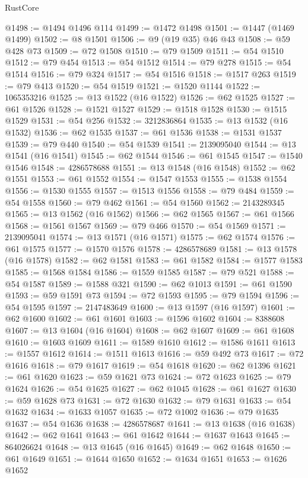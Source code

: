 \begin{lexlean}{RustCore}
\begin{coremodule}
@1498 := @1494 @1496 @114
@1499 := @1472 @1498
@1501 := @1447 (@1469 @1499)
@1502 := @8 @1501
@1506 := @9 (@19 @35) @46 @43
@1508 := @59 @428 @73
@1509 := @72 @1508
@1510 := @79 @1509
@1511 := @54 @1510
@1512 := @79 @454
@1513 := @54 @1512
@1514 := @79 @278
@1515 := @54 @1514
@1516 := @79 @324
@1517 := @54 @1516
@1518 := @1517 @263
@1519 := @79 @413
@1520 := @54 @1519
@1521 := @1520 @1144
@1522 := 1065353216
@1525 := @13 @1522 (@16 @1522)
@1526 := @62 @1525
@1527 := @61 @1526
@1528 := @1521 @1527
@1529 := @1518 @1528
@1530 := @1515 @1529
@1531 := @54 @256
@1532 := 3212836864
@1535 := @13 @1532 (@16 @1532)
@1536 := @62 @1535
@1537 := @61 @1536
@1538 := @1531 @1537
@1539 := @79 @440
@1540 := @54 @1539
@1541 := 2139095040
@1544 := @13 @1541 (@16 @1541)
@1545 := @62 @1544
@1546 := @61 @1545
@1547 := @1540 @1546
@1548 := 4286578688
@1551 := @13 @1548 (@16 @1548)
@1552 := @62 @1551
@1553 := @61 @1552
@1554 := @1547 @1553
@1555 := @1538 @1554
@1556 := @1530 @1555
@1557 := @1513 @1556
@1558 := @79 @484
@1559 := @54 @1558
@1560 := @79 @462
@1561 := @54 @1560
@1562 := 2143289345
@1565 := @13 @1562 (@16 @1562)
@1566 := @62 @1565
@1567 := @61 @1566
@1568 := @1561 @1567
@1569 := @79 @466
@1570 := @54 @1569
@1571 := 2139095041
@1574 := @13 @1571 (@16 @1571)
@1575 := @62 @1574
@1576 := @61 @1575
@1577 := @1570 @1576
@1578 := 4286578689
@1581 := @13 @1578 (@16 @1578)
@1582 := @62 @1581
@1583 := @61 @1582
@1584 := @1577 @1583
@1585 := @1568 @1584
@1586 := @1559 @1585
@1587 := @79 @521
@1588 := @54 @1587
@1589 := @1588 @321
@1590 := @62 @1013
@1591 := @61 @1590
@1593 := @59 @1591 @73
@1594 := @72 @1593
@1595 := @79 @1594
@1596 := @54 @1595
@1597 := 2147483649
@1600 := @13 @1597 (@16 @1597)
@1601 := @62 @1600
@1602 := @61 @1601
@1603 := @1596 @1602
@1604 := 8388608
@1607 := @13 @1604 (@16 @1604)
@1608 := @62 @1607
@1609 := @61 @1608
@1610 := @1603 @1609
@1611 := @1589 @1610
@1612 := @1586 @1611
@1613 := @1557 @1612
@1614 := @1511 @1613
@1616 := @59 @492 @73
@1617 := @72 @1616
@1618 := @79 @1617
@1619 := @54 @1618
@1620 := @62 @1396
@1621 := @61 @1620
@1623 := @59 @1621 @73
@1624 := @72 @1623
@1625 := @79 @1624
@1626 := @54 @1625
@1627 := @62 @1045
@1628 := @61 @1627
@1630 := @59 @1628 @73
@1631 := @72 @1630
@1632 := @79 @1631
@1633 := @54 @1632
@1634 := @1633 @1057
@1635 := @72 @1002
@1636 := @79 @1635
@1637 := @54 @1636
@1638 := 4286578687
@1641 := @13 @1638 (@16 @1638)
@1642 := @62 @1641
@1643 := @61 @1642
@1644 := @1637 @1643
@1645 := 864026624
@1648 := @13 @1645 (@16 @1645)
@1649 := @62 @1648
@1650 := @61 @1649
@1651 := @1644 @1650
@1652 := @1634 @1651
@1653 := @1626 @1652

\end{coremodule}
\end{lexlean}

